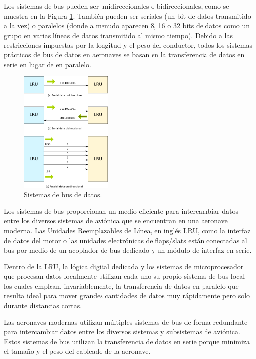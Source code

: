 Los sistemas de bus pueden ser unidireccionales  o bidireccionales, como se muestra en la Figura \ref{fig:01.sistemas.bus.datos}. 
También pueden ser seriales (un bit de datos transmitido a la vez) o paralelos (donde a menudo aparecen 8, 16 o 32 bits de datos como un grupo en varias líneas de datos transmitido al mismo tiempo). Debido a las restricciones impuestas por la longitud y el peso del conductor, todos los sistemas prácticos de bus de datos en aeronaves se basan en la transferencia de datos en serie en lugar de en paralelo.

\begin{figure}[!htb]
  \centering
  \includegraphics[width=0.4\textwidth]{01.tablero.instrumentos/U01.imagenes/U01.5.protocolos.buses.datos/01_Uni_bi_paralelo_datos.png}
  \caption{Sistemas de bus de datos. }%
  \label{fig:01.sistemas.bus.datos}
\end{figure}


Los sistemas de bus proporcionan un medio eficiente para intercambiar datos entre los diversos sistemas de aviónica que se encuentran en una aeronave moderna.
Las Unidades Reemplazables de Línea, en ingl\'es  \ac{LRU}, como la interfaz de datos del motor o las unidades electrónicas de flaps/slats están conectadas al bus por medio de un acoplador de bus dedicado y un módulo de interfaz en serie.

Dentro de la \ac{LRU}, la lógica digital dedicada y los sistemas de microprocesador que procesan datos localmente utilizan cada uno su propio sistema de bus local los cuales emplean, invariablemente, la transferencia de datos en paralelo que resulta ideal para mover grandes cantidades de datos muy rápidamente pero solo durante distancias cortas.


\begin{tcolorbox}
  Las aeronaves modernas utilizan múltiples sistemas de bus de forma
  redundante para intercambiar datos entre los diversos sistemas y
  subsistemas de aviónica. Estos sistemas de bus utilizan la
  transferencia de datos en serie porque minimiza el tamaño y el peso
  del cableado de la aeronave.
\end{tcolorbox}

